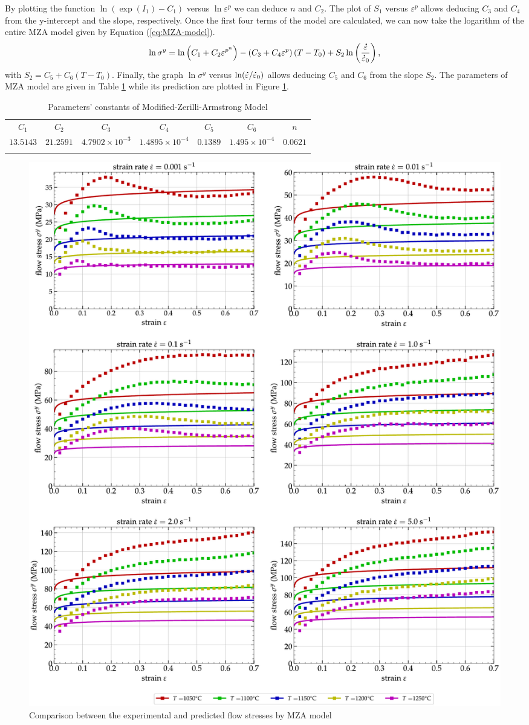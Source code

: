 \documentclass[twoside,english,1p,final,sort&compress]{elsarticle}
\theoremstyle{plain}
\DeclareRobustCommand{\mdot}[1]{\accentset{\mbox{\bfseries .}}{#1}}
\begin{document}
By plotting the function $\ln\left(\exp(I_1)-C_1\right)$ versus $\ln\varepsilon^p$ we can deduce $n$ and $C_2$.
The plot of $S_1$ versus $\varepsilon^p$ allows deducing $C_3$ and $C_4$ from the y-intercept and the slope, respectively.
Once the first four terms of the model are calculated, we can now take the logarithm of the entire MZA model given by Equation (\ref{eq:MZA-model}).
\begin{equation}
\ln\sigma^y = \ln\left(C_{1}+C_{2}\varepsilon^{p^n}\right) - \left(C_{3}+C_{4}\varepsilon^p\right)\left(T-T_0\right) + S_2\ln\left( \frac{\mdot\varepsilon}{\mdot{\varepsilon}_0}\right),
\end{equation}
with $S_2=C_5+C_6\left(T-T_0\right)$.
Finally, the graph $\ln\sigma^y$ versus $ \ln(\mdot\varepsilon/\mdot{\varepsilon}_0)$ allows deducing $C_5$ and $C_6$ from the slope $S_2$.
The parameters of MZA model are given in Table \ref{tab:MZA} while its prediction are plotted in Figure \ref{fig:CompExp-MZA-6}.
\begin{table}[h!]
\centering{}
\caption{Parameters' constants of Modified-Zerilli-Armstrong Model}
\begin{tabular}{ccccccc}
\hline
$C_1$ & $C_2$ & $C_3$ & $C_4$ & $C_5$ & $C_6$ & $n$\\
$13.5143$ & $21.2591$ & $4.7902\times 10^{-3}$ & $1.4895\times 10^{-4}$ & $0.1389$ & $1.495\times 10^{-4}$ & $0.0621$\\
\hline
\label{tab:MZA}
\end{tabular}
\end{table}
\begin{figure}[!ht]
\centering
\includegraphics[width=\columnwidth]
{Figures/CompExp-MZA-6}
\caption{Comparison between the experimental and predicted flow stresses by MZA model}
\label{fig:CompExp-MZA-6}
\end{figure}
\end{document}
